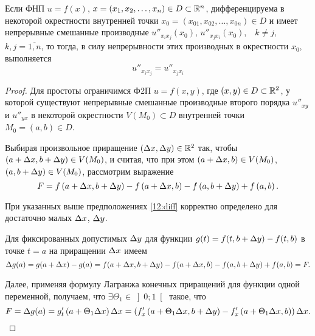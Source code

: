 \documentclass[../../main.tex]{subfiles}
\begin{document}
	\begin{thm}
		\label{secdiffeq}
		Если ФНП $u = f(x)$, $x = \left(x_1, x_2, \dots, x_n\right)\in 
		D\subset\mathbb{R}^n$, дифференцируема в некоторой окрестности внутренней 
		точки $x_0 = \left(x_{01}, x_{02}, \dots, x_{0n}\right)\in D$ и имеет 
		непрерывные смешанные производные $u''_{x_ix_j}(x_0)$, 
		$u''_{x_jx_i}(x_0)$,\ \ $k\ne j$,\ \ $k, j = \overline{1, n}$, то тогда, 
		в силу непрерывности этих производных в окрестности $x_0$, выполняется
		\begin{equation}
			u''_{x_ix_j} = u''_{x_jx_i}
			\label{11:diff}
		\end{equation}
	\end{thm}

	\begin{proof}
		Для простоты ограничимся Ф2П $u=f(x,y)$, где $(x,y)\in D\subset\mathbb{R}^2$, 
		у которой существуют непрерывные смешанные производные второго порядка 
		$u''_{xy}$ и $u''_{yx}$ в некоторой окрестности $V\left(M_0\right)
		\subset D$ внутренней точки $M_0 = (a,b)\in D$.
		
		Выбирая произвольное приращение $\left(\Delta x, \Delta y\right)\in\mathbb{R}^2$ 
		так, чтобы $\left(a + \Delta x, b + \Delta y\right)\in V(M_0)$, и считая, 
		что при этом $\left(a + \Delta x, b\right)\in V(M_0)$, 
		$\left(a, b + \Delta y\right)\in V(M_0)$, рассмотрим выражение
		\begin{equation}
			F=f\left(a + \Delta x, b + \Delta y\right) - f\left(a + \Delta x, b\right) - 
			f\left(a, b + \Delta y\right) + f\left(a, b\right).
			\label{12:diff}
		\end{equation}
		
		При указанных выше предположениях \eqref{12:diff} корректно определено 
		для достаточно малых $\Delta x$, $\Delta y$.
		
		Для фиксированных допустимых $\Delta y$ для функции $g(t)=f(t, b + \Delta y) - 
		f(t, b)$
		в точке $t=a$ на приращении $\Delta x$ имеем
		\[\Delta g(a)=g(a + \Delta x) - g(a) = f(a + \Delta x, b + \Delta y) - f(a + \Delta x, b) - 
		f(a, b + \Delta y) + f(a, b) = F.\]
		
		Далее, применяя формулу Лагранжа конечных приращений для функции 
		одной переменной, получаем, что $\exists\Theta_1\in\left]0;1\right[$ 
		такое, что
		\begin{equation}
			F = \Delta g(a) = g'_t\left(a + \Theta_1\Delta x\right)\Delta x = 
			\left(f'_x\left(a + \Theta_1\Delta x, b + \Delta y\right) - 
			f'_x\left(a + \Theta_1\Delta x, b\right)\right)\Delta x.
			\label{13:diff}
		\end{equation}
		

\end{proof}
\end{document}
